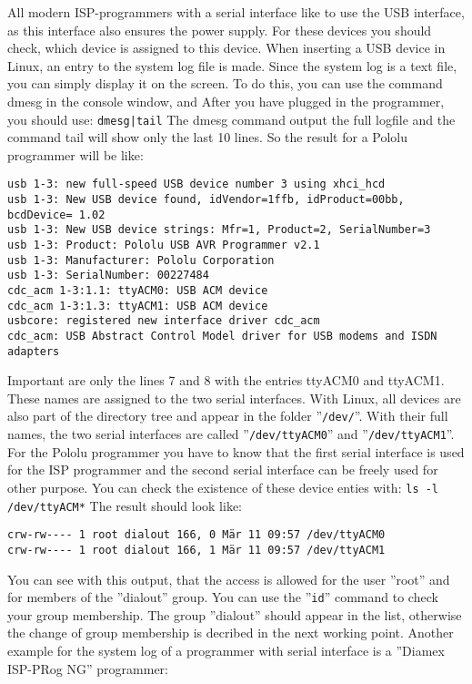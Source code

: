 All modern ISP-programmers with a serial interface like to use the USB interface,
as this interface also ensures the power supply. 
For these devices you should check, which device is assigned to this device.
When inserting a USB device in Linux, an entry to the system log file is made.
Since the system log is a text file, you can simply display it on the screen.
To do this, you can use the command dmesg in the console window, and
After you have plugged in the programmer, you should use:
\large{\newline\verb"dmesg|tail"\newline}
The dmesg command output the full logfile and the command tail will show only the
last 10 lines. So the result for a Pololu programmer will be like:
\begin{footnotesize}
\begin{verbatim}
usb 1-3: new full-speed USB device number 3 using xhci_hcd
usb 1-3: New USB device found, idVendor=1ffb, idProduct=00bb, bcdDevice= 1.02
usb 1-3: New USB device strings: Mfr=1, Product=2, SerialNumber=3
usb 1-3: Product: Pololu USB AVR Programmer v2.1
usb 1-3: Manufacturer: Pololu Corporation
usb 1-3: SerialNumber: 00227484
cdc_acm 1-3:1.1: ttyACM0: USB ACM device
cdc_acm 1-3:1.3: ttyACM1: USB ACM device
usbcore: registered new interface driver cdc_acm
cdc_acm: USB Abstract Control Model driver for USB modems and ISDN adapters
\end{verbatim}
\end{footnotesize}
Important are only the lines 7 and 8 with the entries ttyACM0 and ttyACM1.
These names are assigned to the two serial interfaces.
With Linux, all devices are also part of the directory tree and appear in the
folder ''\verb"/dev/"''.
With their full names, the two serial interfaces are called ''\verb"/dev/ttyACM0"'' and
''\verb"/dev/ttyACM1"''.
For the Pololu programmer you have to know that the first serial interface is used for
the ISP programmer and the second serial interface can be freely used for other purpose.
You can check the existence of these device enties with:
\large{\newline\verb"ls -l /dev/ttyACM*"\newline}
The result should look like:
\begin{footnotesize}
\begin{verbatim}
crw-rw---- 1 root dialout 166, 0 Mär 11 09:57 /dev/ttyACM0
crw-rw---- 1 root dialout 166, 1 Mär 11 09:57 /dev/ttyACM1
\end{verbatim}
\end{footnotesize}
You can see with this output, that the access is allowed for the user ''root''
and for members of the ''dialout'' group.
You can use the ''\verb"id"'' command to check your group membership.
The group ''dialout'' should appear in the list,
otherwise the change of group membership is decribed in the
next working point.
Another example for the system log of a programmer with serial interface
is a ''Diamex ISP-PRog NG'' programmer:

